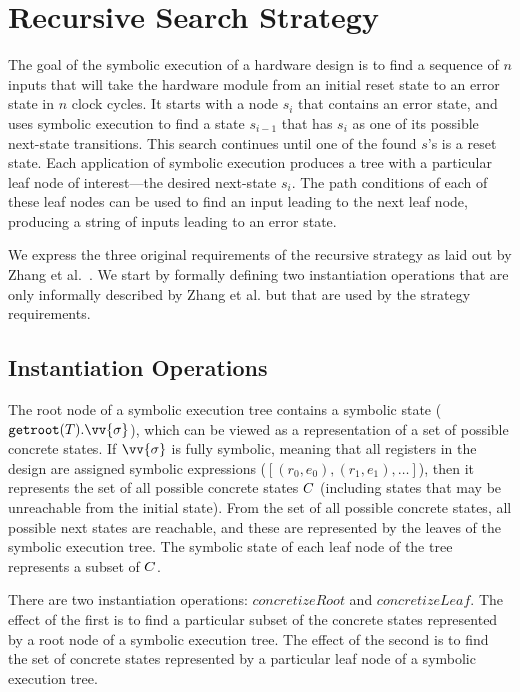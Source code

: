 \section{Recursive Search Strategy}
The goal of the symbolic execution
of a hardware design is to find a sequence of $n$ inputs that will take the hardware
module from an initial reset state to an error state in $n$ clock cycles.
 It starts with a node $s_i$ that contains an error state, and uses symbolic execution to find 
 a state $s_{i-1}$ that has $s_i$ as one of its possible next-state transitions.  
This search continues until one of the found $s$'s is a reset state. 
Each application of symbolic execution produces a tree with a particular leaf node of interest---the desired next-state $s_i$.
The path conditions of each of these leaf nodes can be used to find an input leading to the next leaf node, 
producing a string of inputs leading to an error state.


We express the three original requirements of the recursive strategy as
laid out by Zhang et al.~\cite{zhang2018recursive}. 
We start by formally defining two instantiation operations that are only informally described
by Zhang et al. but that are used by the strategy requirements.

\subsection{Instantiation Operations} 

The root node of a symbolic execution tree \tree{} contains a symbolic state
  ($\mathtt{getroot}(\tree).\vv{\symstate}$), which can be viewed as a representation of
  a set of possible concrete states. If $\vv{\symstate}$ is fully symbolic, meaning
  that all registers in the design are assigned symbolic expressions ($[(r_0,e_0),(r_1,e_1),\ldots]$), then it represents the set of all
  possible concrete states $C$ (including states that may be
  unreachable from the initial state). From the set of all possible concrete
  states, all possible next states are reachable, and these are represented by
  the leaves of the symbolic execution tree. The symbolic state of each leaf node of the tree
  represents a subset of $C$.

  There are two instantiation operations: $\mathit{concretizeRoot}$ and
  $\mathit{concretizeLeaf}$. The effect of the first is to find a particular
  subset of the concrete states represented by a root node of a symbolic
  execution tree. The effect of the second is to find the set of concrete states
  represented by a particular leaf node of a symbolic execution tree. 

